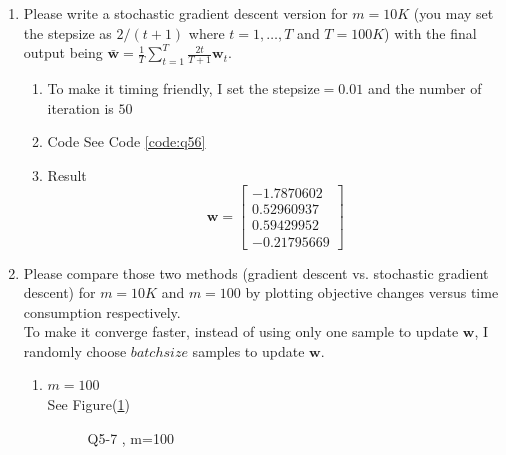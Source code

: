 \documentclass[11pt]{article}
\newcommand{\vct}[1]{\mathbf{#1}}
\def \vw {\vct{w}}
\begin{document}
\begin{enumerate}
\begin{enumerate}
	\end{enumerate}
	\item Please write a stochastic gradient descent version for $m=10K$ (you may set the stepsize as $2/(t+1)$ where $t=1,\dots,T$ and $T=100K$) with the final output being $\bar{\vw}=\frac{1}{T}\sum_{t=1}^{T}\frac{2t}{T+1}\vw_t$.  
	\begin{enumerate}
		\item To make it timing friendly, I set the stepsize$=0.01$ and the number of iteration is $50$
		\item Code
		See Code \ref{code:q56}
		\item Result
		$$\vw= \begin{bmatrix}
			-1.7870602\\
			0.52960937\\
			0.59429952\\
			-0.21795669
		\end{bmatrix}$$    
	\end{enumerate}
	 
	 
	\item Please compare those two methods (gradient descent vs. stochastic gradient descent) for $m=10K$ and $m=100$ by plotting objective changes versus time consumption respectively.
		\\
		\newline
		To make it converge faster, instead of using only one sample to update $\vw$, 
		I randomly choose $batchsize$ samples to update $\vw$.
		\begin{enumerate}
			\item $m=100$\\
			See Figure(\ref{fig:q57100})
			\begin{figure}[h]
				\centering
				\caption{Q5-7 , m=100 }\label{fig:q57100}
			  \end{figure} 
		


\end{enumerate}
\end{enumerate}
\end{document}
